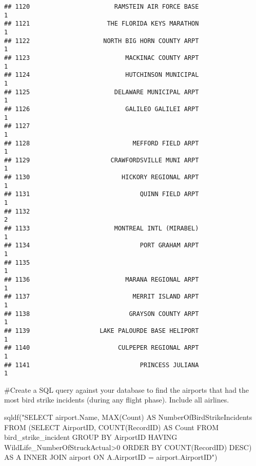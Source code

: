 \documentclass[
]{article}
\newenvironment{Shaded}{\begin{snugshade}}{\end{snugshade}}
\newcommand{\FunctionTok}[1]{\textcolor[rgb]{0.00,0.00,0.00}{#1}}
\newcommand{\NormalTok}[1]{#1}
\newcommand{\StringTok}[1]{\textcolor[rgb]{0.31,0.60,0.02}{#1}}
\begin{document}
\begin{verbatim}
## 1120                       RAMSTEIN AIR FORCE BASE                           1
## 1121                     THE FLORIDA KEYS MARATHON                           1
## 1122                    NORTH BIG HORN COUNTY ARPT                           1
## 1123                          MACKINAC COUNTY ARPT                           1
## 1124                          HUTCHINSON MUNICIPAL                           1
## 1125                       DELAWARE MUNICIPAL ARPT                           1
## 1126                          GALILEO GALILEI ARPT                           1
## 1127                                                                         1
## 1128                            MEFFORD FIELD ARPT                           1
## 1129                      CRAWFORDSVILLE MUNI ARPT                           1
## 1130                         HICKORY REGIONAL ARPT                           1
## 1131                              QUINN FIELD ARPT                           1
## 1132                                                                         2
## 1133                       MONTREAL INTL (MIRABEL)                           1
## 1134                              PORT GRAHAM ARPT                           1
## 1135                                                                         1
## 1136                          MARANA REGIONAL ARPT                           1
## 1137                            MERRIT ISLAND ARPT                           1
## 1138                           GRAYSON COUNTY ARPT                           1
## 1139                   LAKE PALOURDE BASE HELIPORT                           1
## 1140                        CULPEPER REGIONAL ARPT                           1
## 1141                              PRINCESS JULIANA                           1
\end{verbatim}

\#Create a SQL query against your database to find the airports that had
the most bird strike incidents (during any flight phase). Include all
airlines.

\begin{Shaded}
\begin{Highlighting}[]
\FunctionTok{sqldf}\NormalTok{(}\StringTok{"SELECT airport.Name, MAX(Count) AS NumberOfBirdStrikeIncidents FROM (SELECT AirportID, COUNT(RecordID) AS Count FROM bird\_strike\_incident}
\StringTok{    GROUP BY AirportID HAVING WildLife\_NumberOfStruckActual\textgreater{}0}
\StringTok{    ORDER BY COUNT(RecordID) DESC) AS A INNER JOIN airport ON A.AirportID = airport.AirportID"}\NormalTok{)}
\end{Highlighting}
\end{Shaded}
\end{document}
